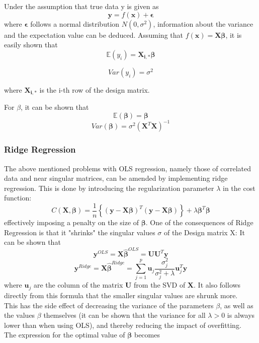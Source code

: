 \documentclass[11pt,a4paper,titlepage]{article}
\begin{document}
Under the assumption that true data y is given as
\begin{equation*}
\bm{y}=f(\bm{x})+\bm{\epsilon}
\end{equation*}
where $\bm{\epsilon}$ follows a normal distribution $N(0,\sigma^2)$, information about the variance and the expectation value can be deduced. Assuming that $f(\bm{x})=\bm{X\beta}$, it is easily shown that
\begin{equation*}
\mathbb{E}(y_i)=\bm{X_{i,*}\beta}
\end{equation*}

\begin{equation*}
Var(y_i)=\sigma^2
\end{equation*}

where $\bm{X_{i,*}}$ is the i-th row of the design matrix.

For $\beta$, it can be shown that
\begin{equation*}
\mathbb{E}(\bm{\beta})=\bm{\beta}
\end{equation*}
\begin{equation*}
Var(\bm{\beta})=\sigma^2(\bm{X}^T\bm{X})^{-1}
\end{equation*}
\subsubsection{Ridge Regression}
The above mentioned problems with OLS regression, namely those of correlated data and near singular matrices, can be amended by implementing ridge regression. This is done by introducing the regularization parameter $ \lambda$ in the cost function:
\begin{equation*}
    C(\boldsymbol{X},\boldsymbol{\beta})=\frac{1}{n}\left\{(\boldsymbol{y}-\boldsymbol{X}\boldsymbol{\beta})^T(\boldsymbol{y}-\boldsymbol{X}\boldsymbol{\beta})\right\}+\lambda\boldsymbol{\beta}^T\boldsymbol{\beta}
\end{equation*}
effectively imposing a penalty on the size of $\boldsymbol{\beta}$. One of the consequences of Ridge Regression is that it "shrinks" the singular values $\sigma$ of the Design matrix X: It can be shown that \citep{hastie01statisticallearning}
\begin{equation*}
\bm{y}^{OLS}=\bm{X\hat\beta}^{OLS}=\bm{UU}^T\bm{y}
\end{equation*}
\begin{equation*}
\bm{y}^{Ridge}=\bm{X\hat\beta}^{Ridge}=\sum_{j=1}^{p}\bm{u}_j\frac{\sigma_j^2}{\sigma_j^2+\lambda}\bm{u}^T_j\bm{y}
\end{equation*}
where $\bm{u}_j$ are the column of the matrix $\bm{U}$ from the SVD of $\bm{X}$. It also follows directly from this formula that the smaller singular values are shrunk more.\\
This has the side effect of decreasing the variance of the parameters $\beta$, as well as the values $\beta$ themselves (it can be shown \citep{Ridge_Lecture_Notes} that the variance for all $\lambda>0$ is always lower than when using OLS), and thereby reducing the impact of overfitting.\\The expression for the optimal value of $\boldsymbol{\beta}$ becomes
\end{document}
